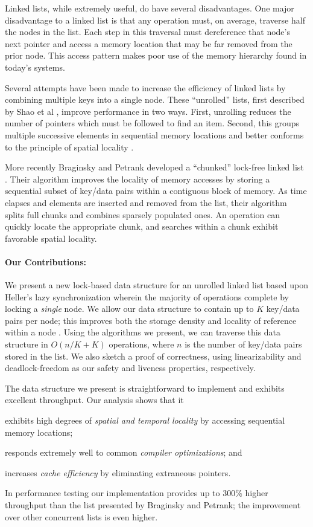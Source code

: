 \documentclass{llncs}
\begin{document}
Linked lists, while extremely useful, do have several disadvantages.  
One major disadvantage to a linked list is that any operation must,
on average, traverse half the nodes in the list.  Each step in this
traversal must dereference that node's next pointer and access
a memory location that may be far removed from the prior node.  This
access pattern makes poor use of the memory hierarchy found in today's
systems.

Several attempts have been made to increase the efficiency of linked
lists by combining multiple keys into a single node.  These ``unrolled'' 
lists, first described by Shao et al \cite{Shao:UnrollingLists}, improve performance
in two ways.  First, unrolling reduces the number of pointers which must be followed
to find an item.  Second, this groups multiple successive elements in sequential
memory locations and better conforms to the principle of
spatial locality {\cite{Demaine:CacheOblivious, Patterson:COD5}}.

More recently Braginsky and Petrank developed a ``chunked'' lock-free linked list
\cite{Braginsky}.  Their algorithm improves the locality of memory accesses
by storing a sequential subset of key/data pairs within a
contiguous block of memory.  As time elapses and elements are inserted
and removed from the list, their algorithm splits full chunks and combines
sparsely populated ones.  An operation can quickly locate
the appropriate chunk, and searches within a chunk exhibit favorable
spatial locality.

\paragraph{Our Contributions:} We present a new lock-based data structure
for an unrolled linked list based upon Heller's lazy synchronization wherein
the majority of operations complete by
locking a {\em single} node.  We allow our data structure to contain up to 
$K$ key/data pairs per node; this improves both the storage density and
locality of reference within a node \cite{Demaine:CacheOblivious}.  Using the algorithms we present,
we can traverse this data structure in $O(n/K + K)$ operations, where
$n$ is the number of key/data pairs stored in the list.  We also sketch a proof
of correctness, using linearizability and deadlock-freedom as our
safety and liveness properties, respectively.

The data structure we present is straightforward to implement and exhibits
excellent throughput.  Our analysis shows that it 
\begin{inparaenum}[(i)]
\item exhibits high degrees of {\em spatial and temporal locality} by accessing
sequential memory locations; 
\item responds extremely well to common {\em compiler optimizations};
and \item increases {\em cache efficiency} by eliminating extraneous pointers.
\end{inparaenum}
In performance testing our implementation
provides up to 300\% higher throughput than the list presented by Braginsky and 
Petrank{\cite{Braginsky}}; the improvement over other concurrent lists is even higher.
\end{document}

